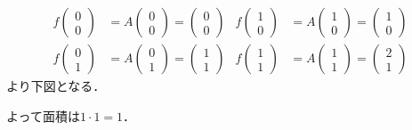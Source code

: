 \begin{ans}
\begin{align*}
f\begin{pmatrix}0 \\ 0\end{pmatrix} &= A\begin{pmatrix}0 \\ 0\end{pmatrix} = \begin{pmatrix}0 \\ 0\end{pmatrix}&
f\begin{pmatrix}1 \\ 0\end{pmatrix} &= A\begin{pmatrix}1 \\ 0\end{pmatrix} = \begin{pmatrix}1 \\ 0\end{pmatrix}\\
f\begin{pmatrix}0 \\ 1\end{pmatrix} &= A\begin{pmatrix}0 \\ 1\end{pmatrix} = \begin{pmatrix}1 \\ 1\end{pmatrix}&
f\begin{pmatrix}1 \\ 1\end{pmatrix} &= A\begin{pmatrix}1 \\ 1\end{pmatrix} = \begin{pmatrix}2 \\ 1\end{pmatrix}
\end{align*}
より下図となる．
\begin{center}\end{center}
よって面積は$1\cdot1=1$．
\end{ans}